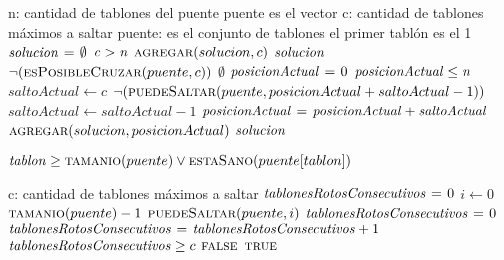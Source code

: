 \vspace*{0.5cm}


\begin{codebox}
\li \Comment n: cantidad de tablones del puente puente es el vector 
\li \Comment c: cantidad de tablones máximos a saltar
\li \Comment puente: es el conjunto de tablones 
\li \Comment el primer tablón es el 1
\li $\id{solucion} \gets \emptyset$
\li \If $\id{c} > \id{n}$
\li     \Then 
            $\textnormal{\scshape agregar}(solucion, c)$
\li         \Return $\id{solucion}$
        \End
\li \If $\neg(\textnormal{\scshape esPosibleCruzar}(puente, c))$
\li     \Then 
            \Return $\emptyset$
        \End
\li $\id{posicionActual} \gets 0$
\li \While $\id{posicionActual} \leq \id{n}$
\li     \Do 
            $saltoActual \gets c$
\li         \While $\neg(\textnormal{\scshape puedeSaltar}(puente, posicionActual + saltoActual - 1))$
\li         \Do 
                $saltoActual \gets saltoActual - 1$
            \End
\li     $\id{posicionActual} \gets \id{posicionActual} + \id{saltoActual}$
\li     $\textnormal{\scshape agregar}(solucion, posicionActual)$    
        \End
\li \Return $\id{solucion}$
\end{codebox}      



\vspace*{0.5cm}



\begin{codebox}
    \Return $\id{tablon} \geq \proc{tamanio}(puente) \lor \proc{estaSano}(puente[tablon])$
\end{codebox}



\vspace*{0.5cm}



\begin{codebox}
\li \Comment c: cantidad de tablones máximos a saltar
\li $\id{tablonesRotosConsecutivos} \gets 0$
\li \For $i \gets 0$ \To $\textnormal{\scshape tamanio}(puente) - 1$
\li     \Do 
            \If $\textnormal{\scshape puedeSaltar}(puente, i)$
\li             \Then
                    $\id{tablonesRotosConsecutivos} \gets 0$
\li         \Else
\li             $\id{tablonesRotosConsecutivos} \gets \id{tablonesRotosConsecutivos} + 1$
            \End
\li         \If $\id{tablonesRotosConsecutivos} \geq c$
\li             \Then
                    \Return $\textnormal{\scshape false}$
            \End
        \End
\li \Return $\textnormal{\scshape true}$   
\end{codebox}



